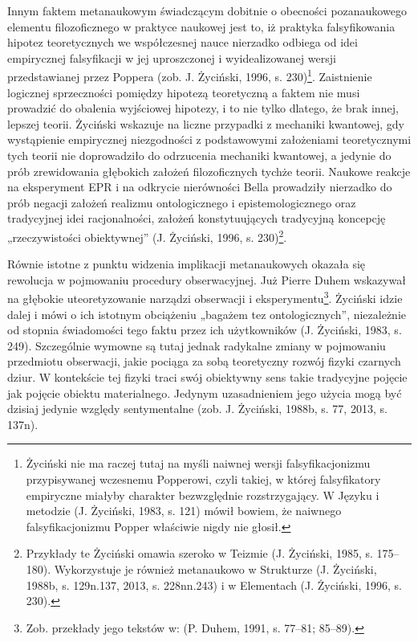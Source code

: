 \documentclass{article}
\begin{document}
Innym faktem metanaukowym świadczącym dobitnie o obecności pozanaukowego elementu filozoficznego w praktyce naukowej
jest to, iż praktyka falsyfikowania hipotez teoretycznych we współczesnej nauce nierzadko odbiega od idei empirycznej
falsyfikacji w jej uproszczonej i wyidealizowanej wersji przedstawianej przez Poppera \label{ref:RNDLar942AozJ}(zob. J.
Życiński, 1996, s. 230)\footnote{Życiński nie ma raczej tutaj na myśli naiwnej wersji falsyfikacjonizmu przypisywanej
wczesnemu Popperowi, czyli takiej, w której falsyfikatory empiryczne miałyby charakter bezwzględnie rozstrzygający. W
Języku i metodzie \label{ref:RNDyLCTuOy1b8}(J. Życiński, 1983, s. 121) mówił bowiem, że naiwnego falsyfikacjonizmu
Popper właściwie nigdy nie głosił.}. Zaistnienie logicznej sprzeczności pomiędzy hipotezą teoretyczną a faktem nie musi
prowadzić do obalenia wyjściowej hipotezy, i to nie tylko dlatego, że brak innej, lepszej teorii. Życiński wskazuje na
liczne przypadki z mechaniki kwantowej, gdy wystąpienie empirycznej niezgodności z podstawowymi założeniami
teoretycznymi tych teorii nie doprowadziło do odrzucenia mechaniki kwantowej, a jedynie do prób zrewidowania głębokich
założeń filozoficznych tychże teorii. Naukowe reakcje na eksperyment EPR i na odkrycie nierówności Bella prowadziły
nierzadko do prób negacji założeń realizmu ontologicznego i epistemologicznego oraz tradycyjnej idei racjonalności,
założeń konstytuujących tradycyjną koncepcję „rzeczywistości obiektywnej” \label{ref:RND9B582PV6dW}(J. Życiński, 1996,
s. 230)\footnote{Przykłady te Życiński omawia szeroko w Teizmie \label{ref:RNDeDVxzhZtXS}(J. Życiński, 1985, s.
175–180). Wykorzystuje je również metanaukowo w Strukturze \label{ref:RNDYDcMfhVjkQ}(J. Życiński, 1988b, s. 129n.137,
2013, s. 228nn.243) i w Elementach \label{ref:RNDMGOXueF4r7}(J. Życiński, 1996, s. 230).}.

Równie istotne z punktu widzenia implikacji metanaukowych okazała się rewolucja w pojmowaniu procedury obserwacyjnej.
Już Pierre Duhem wskazywał na głębokie uteoretyzowanie narządzi obserwacji i eksperymentu\footnote{Zob. przekłady jego
tekstów w: \label{ref:RND7H3en34uaC}(P. Duhem, 1991, s. 77–81; 85–89).}. Życiński idzie dalej i mówi o ich istotnym
obciążeniu „bagażem tez ontologicznych”, niezależnie od stopnia świadomości tego faktu przez ich użytkowników
\label{ref:RND1c8rmkjZxD}(J. Życiński, 1983, s. 249). Szczególnie wymowne są tutaj jednak radykalne zmiany w pojmowaniu
przedmiotu obserwacji, jakie pociąga za sobą teoretyczny rozwój fizyki czarnych dziur. W kontekście tej fizyki traci
swój obiektywny sens takie tradycyjne pojęcie jak pojęcie obiektu materialnego. Jedynym uzasadnieniem jego użycia mogą
być dzisiaj jedynie względy sentymentalne \label{ref:RNDdNrJ37wYMr}(zob. J. Życiński, 1988b, s. 77, 2013, s. 137n).
\end{document}

